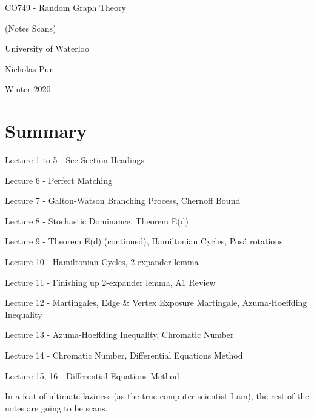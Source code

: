 \documentclass[12pt]{article}
\newcommand{\includelecture}[1]{
  
  
  \clearpage
}
\begin{document}
\begin{titlepage}
  \centering
  \vspace*{2in}
  {\huge CO749 - Random Graph Theory}\par
  {\Large (Notes Scans)}\par
  \vspace{0.3in}
  {\large University of Waterloo}\par
  {\large Nicholas Pun}\par
  {\large Winter 2020}\par 
\end{titlepage}
 
\tableofcontents
\clearpage

\section*{Summary}
Lecture 1 to 5 - See Section Headings

Lecture 6 - Perfect Matching

Lecture 7 - Galton-Watson Branching Process, Chernoff Bound

Lecture 8 - Stochastic Dominance, Theorem E(d)

Lecture 9 - Theorem E(d) (continued), Hamiltonian Cycles, Pos{\'a} rotations

Lecture 10 - Hamiltonian Cycles, 2-expander lemma

Lecture 11 - Finishing up 2-expander lemma, A1 Review

Lecture 12 - Martingales, Edge \& Vertex Exposure Martingale, Azuma-Hoeffding Inequality

Lecture 13 - Azuma-Hoeffding Inequality, Chromatic Number

Lecture 14 - Chromatic Number, Differential Equations Method

Lecture 15, 16 - Differential Equations Method

\clearpage


\clearpage
\clearpage
\clearpage
\clearpage
\clearpage

In a feat of ultimate laziness (as the true computer scientist I am), the rest of the notes are going to be scans.

\includelecture{sections/lec6.pdf}
\includelecture{sections/lec7.pdf}
\includelecture{sections/lec8.pdf}
\includelecture{sections/lec9.pdf}
\includelecture{sections/lec10.pdf}
\includelecture{sections/lec11.pdf}
\includelecture{sections/lec12.pdf}
\includelecture{sections/lec13.pdf}
\includelecture{sections/lec14.pdf}
\includelecture{sections/lec15.pdf}
\includelecture{sections/lec16.pdf}

\nocite{*}


\end{document}
